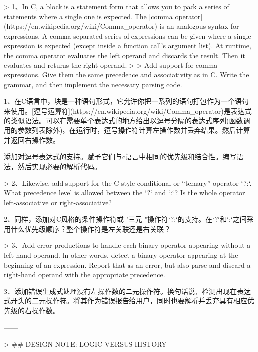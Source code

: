 \documentclass[cn,11pt,chinese]{elegantbook}
\begin{document}
> 1、In C, a block is a statement form that allows you to pack a series of statements where a single one is expected. The [comma operator](https://en.wikipedia.org/wiki/Comma_operator) is an analogous syntax for expressions. A comma-separated series of expressions can be given where a single expression is expected (except inside a function call’s argument list). At runtime, the comma operator evaluates the left operand and discards the result. Then it evaluates and returns the right operand.
>
> Add support for comma expressions. Give them the same precedence and associativity as in C. Write the grammar, and then implement the necessary parsing code.

1、在C语言中，块是一种语句形式，它允许你把一系列的语句打包作为一个语句来使用。[逗号运算符](https://en.wikipedia.org/wiki/Comma_operator)是表达式的类似语法。可以在需要单个表达式的地方给出以逗号分隔的表达式序列(函数调用的参数列表除外)。在运行时，逗号操作符计算左操作数并丢弃结果。然后计算并返回右操作数。

添加对逗号表达式的支持。赋予它们与c语言中相同的优先级和结合性。编写语法，然后实现必要的解析代码。

> 2、Likewise, add support for the C-style conditional or “ternary” operator `?:`. What precedence level is allowed between the `?` and `:`? Is the whole operator left-associative or right-associative?

2、同样，添加对C风格的条件操作符或 "三元 "操作符`?:`的支持。在`?`和`:`之间采用什么优先级顺序？整个操作符是左关联还是右关联？

> 3、Add error productions to handle each binary operator appearing without a left-hand operand. In other words, detect a binary operator appearing at the beginning of an expression. Report that as an error, but also parse and discard a right-hand operand with the appropriate precedence.

3、添加错误生成式处理没有左操作数的二元操作符。换句话说，检测出现在表达式开头的二元操作符。将其作为错误报告给用户，同时也要解析并丢弃具有相应优先级的右操作数。

------

> ## DESIGN NOTE: LOGIC VERSUS HISTORY
\end{document}
